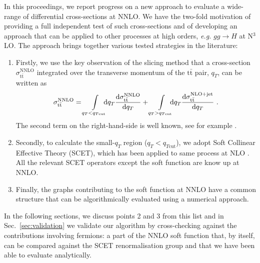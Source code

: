 \documentclass{appolb}
\newcommand{\dd}{\text{d}}
\newcommand{\ttb}{\text{t} \bar{\text{t}} }
\begin{document}
In this proceedings, we report progress on a new approach to evaluate a wide-range of differential cross-sections at NNLO. 
We have the two-fold motivation of  providing a full independent test of such cross-sections and of developing an approach that 
can be applied to other processes at high orders, \emph{e.g.} $gg\to H$ at N$^3$LO. The approach brings together various tested 
strategies in the literature:
\begin{enumerate}
\item Firstly, we use the key observation of the slicing method \cite{Bonciani:2015sha,Catani:2007vq} that a cross-section $\sigma^{\text{NNLO}}_{\ttb}$ integrated over the transverse momentum of the  $\ttb$ pair, $q_T$, can be written as
\begin{align}
\sigma^{\text{NNLO}}_{\ttb}=
\int\displaylimits_{q_T < q_{T\text{cut}}} \!\!\!\! \dd q_T  
\frac{\dd \sigma^{\text{NNLO}}_{\ttb} }{\dd q_T}+
\int\displaylimits_{q_T > q_{T\text{cut}}}\!\!\!\! \dd q_T  
\frac{\dd \sigma_{\ttb}^{\text{NLO+jet}}}{\dd q_T}~.
 \label{eq:master}
\end{align} 
The second term on the right-hand-side is well known, see for example \cite{Dittmaier:2007wz,Dittmaier:2008uj}. 
\item Secondly, to calculate the small-$q_T$ region ($q_T<q_{T\text{cut}}$),  we adopt Soft Collinear Effective Theory (SCET), which has been applied to same process at NLO \cite{Li:2013mia}. All the relevant SCET operators except the soft function are  know up at NNLO. 
\item Finally, the graphs contributing to the soft function at NNLO have a common structure that can be algorithmically evaluated using a numerical approach. 
\end{enumerate}
In the following sections, we discuss points 2 and 3 from this list and in Sec.~\ref{sec:validation} we validate our algorithm by cross-checking against the contributions involving fermions: a part of the NNLO soft function that, by itself, can be compared against the SCET renormalisation group  and that we have been able to evaluate analytically. 
\end{document}
